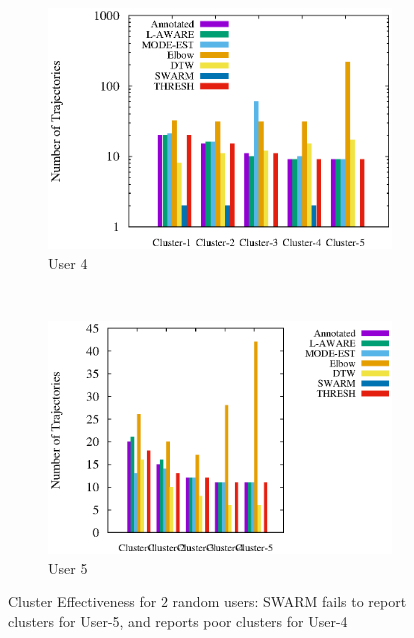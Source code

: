\begin{figure}[t!]
    \centering
    \begin{subfigure}[t]{.3\textwidth}
        \centering
        \includegraphics[scale=0.4,keepaspectratio]{figs/bar_user014.eps}
        \caption{User 4}
        \label{fig:user1}
    \end{subfigure}%
    ~
    \begin{subfigure}[t]{.3\textwidth}
        \centering
        \includegraphics[scale=0.4,keepaspectratio]{figs/bar_user010.eps}
        \caption{User 5}
        \label{fig:user2}
    \end{subfigure}
   \caption{Cluster Effectiveness for $2$ random users: SWARM fails to report clusters for User-5, and reports poor clusters for User-4}
    \label{fig:bargrph}
\end{figure}

